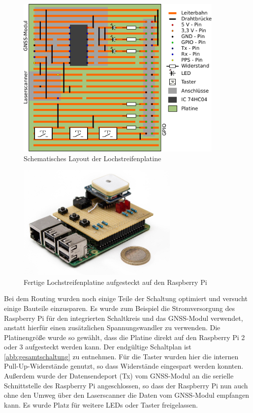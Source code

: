 \documentclass[a4paper,12pt,bibliography=totoc, listof=totoc,titlepage,pointlessnumbers]{scrreprt}
\begin{document}
\begin{figure}[!ht]
 \centering
 \includegraphics[width=0.9\textwidth]{img/platine.pdf}
 \caption{Schematisches Layout der Lochstreifenplatine}
 \label{abb:platine}
\end{figure}

\begin{figure}[!ht]
 \centering
 \includegraphics[width=0.7\textwidth]{img/elektronik.jpg}
 \caption{Fertige Lochstreifenplatine aufgesteckt auf den Raspberry Pi}
 \label{abb:elektronik}
\end{figure}

Bei dem Routing wurden noch einige Teile der Schaltung optimiert und versucht einige Bauteile einzusparen. Es wurde zum Beispiel die Stromversorgung des Rasp\-berry Pi für den integrierten Schaltkreis und das GNSS-Modul verwendet, anstatt hierfür einen zusätzlichen Spannungswandler zu verwenden. Die Platinengröße wurde so gewählt, dass die Platine direkt auf den Rasp\-berry Pi 2 oder 3 aufgesteckt werden kann. Der endgültige Schaltplan ist \autoref{abb:gesamtschaltung} zu entnehmen. Für die Taster wurden hier die internen Pull-Up-Widerstände genutzt, so dass Widerstände eingespart werden konnten. Außerdem wurde der Datensendeport (Tx) vom GNSS-Modul an die serielle Schnittstelle des Rasp\-berry Pi angeschlossen, so dass der Rasp\-berry Pi nun auch ohne den Umweg über den Laser\-scan\-ner die Daten vom GNSS-Modul empfangen kann. Es wurde Platz für weitere LEDs oder Taster freigelassen.
\end{document}
